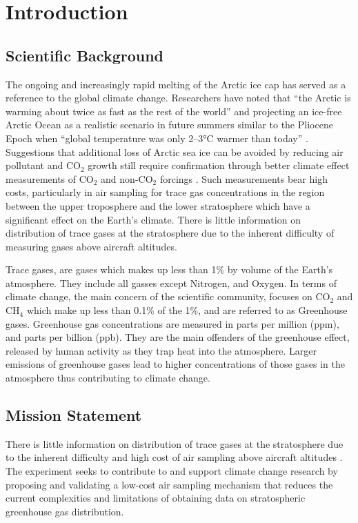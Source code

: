\documentclass[a4paper,12pt,twoside]{article}
\begin{document}
%

\section{Introduction}
\subsection{Scientific Background}

The ongoing and increasingly rapid melting of the Arctic ice cap has served as a reference to the global climate change. Researchers have noted that \enquote{the Arctic is warming about twice as fast as the rest of the world} \cite{Perkins} and projecting an ice-free Arctic Ocean as a realistic scenario in future summers similar to the Pliocene Epoch when \enquote{global temperature was only 2–3°C warmer than today} \cite{Trace}. Suggestions that additional loss of Arctic sea ice can be avoided by reducing air pollutant and CO$_{2}$ growth still require confirmation through better climate effect measurements of CO$_{2}$ and non-CO$_{2}$ forcings \cite{Trace}. Such measurements bear high costs, particularly in air sampling for trace gas concentrations in the region between the upper troposphere and the lower stratosphere which have a significant effect on the Earth's climate. There is little information on distribution of trace gases at the stratosphere due to the inherent difficulty of measuring gases above aircraft altitudes.

Trace gases, are gases which makes up less than 1\% by volume of the Earth's atmosphere. They include all gasses except Nitrogen, and Oxygen. In terms of climate change, the main concern of the scientific community, focuses on CO$_2$ and CH$_4$ which make up less than 0.1\% of the 1\%, and are referred to as Greenhouse gases. Greenhouse gas concentrations are measured in parts per million (ppm), and parts per billion (ppb). They are the main offenders of the greenhouse effect, released by human activity as they trap heat into the atmosphere. Larger emissions of greenhouse gases lead to higher concentrations of those gases in the atmosphere thus contributing to climate change.

\subsection{Mission Statement}

There is little information on distribution of trace gases at the stratosphere due to the inherent difficulty and high cost of air sampling above aircraft altitudes \cite{Trace}. The experiment seeks to contribute to and support climate change research by proposing and validating a low-cost air sampling mechanism that reduces the current complexities and limitations of obtaining data on stratospheric greenhouse gas distribution.
\pagebreak
\end{document}
